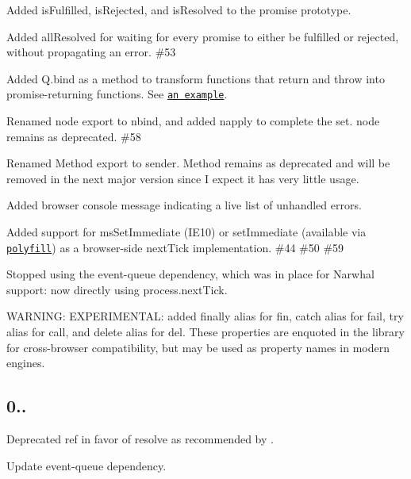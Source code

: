 \begin{DoxyItemize}
\item Added {\ttfamily is\+Fulfilled}, {\ttfamily is\+Rejected}, and {\ttfamily is\+Resolved} to the promise prototype.
\item Added {\ttfamily all\+Resolved} for waiting for every promise to either be fulfilled or rejected, without propagating an error.  \#53
\item Added {\ttfamily Q.\+bind} as a method to transform functions that return and throw into promise-\/returning functions. See \href{https://gist.github.com/1782808}{\tt an example}. 
\item Renamed {\ttfamily node} export to {\ttfamily nbind}, and added {\ttfamily napply} to complete the set. {\ttfamily node} remains as deprecated.  \#58
\item Renamed {\ttfamily Method} export to {\ttfamily sender}. {\ttfamily Method} remains as deprecated and will be removed in the next major version since I expect it has very little usage.
\item Added browser console message indicating a live list of unhandled errors.
\item Added support for {\ttfamily ms\+Set\+Immediate} (I\+E10) or {\ttfamily set\+Immediate} (available via \href{https://github.com/NobleJS/setImmediate}{\tt polyfill}) as a browser-\/side {\ttfamily next\+Tick} implementation. \#44 \#50 \#59
\item Stopped using the event-\/queue dependency, which was in place for Narwhal support\+: now directly using {\ttfamily process.\+next\+Tick}.
\item W\+A\+R\+N\+I\+NG\+: E\+X\+P\+E\+R\+I\+M\+E\+N\+T\+AL\+: added {\ttfamily finally} alias for {\ttfamily fin}, {\ttfamily catch} alias for {\ttfamily fail}, {\ttfamily try} alias for {\ttfamily call}, and {\ttfamily delete} alias for {\ttfamily del}. These properties are enquoted in the library for cross-\/browser compatibility, but may be used as property names in modern engines.
\end{DoxyItemize}

\subsection*{0..}


\begin{DoxyItemize}
\item Deprecated {\ttfamily ref} in favor of {\ttfamily resolve} as recommended by .
\item Update event-\/queue dependency.
\end{DoxyItemize}

